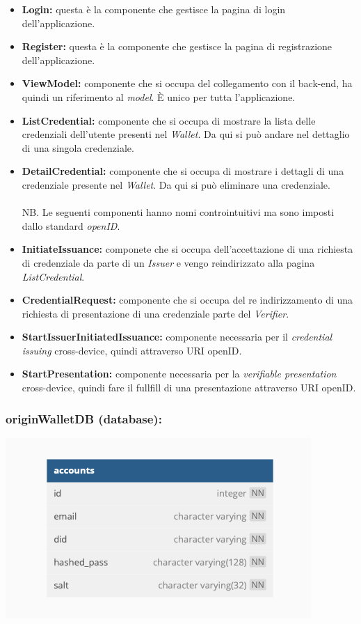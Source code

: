 \begin{itemize}      
    \item \textbf{Login:} questa è la componente che gestisce la pagina di login dell'applicazione. 
    \item \textbf{Register:} questa è la componente che gestisce la pagina di registrazione dell'applicazione.
    \item \textbf{ViewModel:} componente che si occupa del collegamento con il back-end, ha quindi un riferimento al \textit{model}. È unico per tutta l'applicazione.
    \item \textbf{ListCredential:} componente che si occupa di mostrare la lista delle credenziali dell'utente presenti nel \textit{Wallet}. Da qui si può andare nel dettaglio di una singola credenziale.
    \item \textbf{DetailCredential:} componente che si occupa di mostrare i dettagli di una credenziale presente nel \textit{Wallet}. Da qui si può eliminare una credenziale.\\
    \\NB. Le seguenti componenti hanno nomi controintuitivi ma sono imposti dallo standard \textit{openID}.
    \item \textbf{InitiateIssuance:} componete che si  occupa dell'accettazione di una richiesta di credenziale da parte di un \textit{Issuer} e vengo reindirizzato alla pagina \textit{ListCredential}.
    \item \textbf{CredentialRequest:} componente che si occupa del re indirizzamento di una richiesta di presentazione di una credenziale parte del \textit{Verifier}. 
    \item \textbf{StartIssuerInitiatedIssuance:} componente necessaria per il \textit{credential issuing} cross-device, quindi attraverso URI openID.
    \item \textbf{StartPresentation:} componente necessaria per la \textit{verifiable presentation} cross-device, quindi fare il fullfill di una presentazione attraverso URI openID.
\end{itemize}

\subsubsection{originWalletDB (database):}
     \begin{center}
        \includegraphics[scale = 0.6]{./res/img/walletdb.png}
      \end{center}
    

